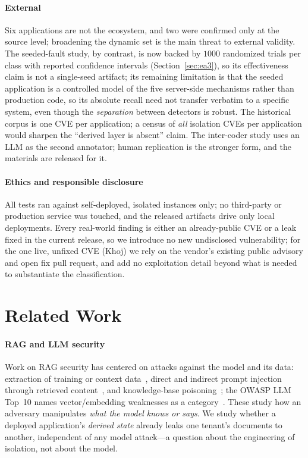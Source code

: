 \IfFileExists{IEEEtran.cls}{\documentclass[conference]{IEEEtran}}{\documentclass[10pt,twocolumn]{article}}
\begin{document}
\paragraph{External}
Six applications are not the ecosystem, and two were confirmed only at the source level; broadening
the dynamic set is the main threat to external validity. The seeded-fault study, by contrast, is now
backed by $1000$ randomized trials per class with reported confidence intervals
(Section~\ref{sec:ea3}), so its effectiveness claim is not a single-seed artifact; its remaining
limitation is that the seeded application is a controlled model of the five server-side mechanisms
rather than production code, so its absolute recall need not transfer verbatim to a specific system,
even though the \emph{separation} between detectors is robust. The historical corpus is one CVE per
application; a census of \emph{all} isolation CVEs per application would sharpen the ``derived layer
is absent'' claim. The inter-coder study uses an LLM as the second annotator; human replication is
the stronger form, and the materials are released for it.

\paragraph{Ethics and responsible disclosure}
All tests ran against self-deployed, isolated instances only; no third-party or production service
was touched, and the released artifacts drive only local deployments. Every real-world finding is
either an already-public CVE or a leak fixed in the current release, so we introduce no new
undisclosed vulnerability; for the one live, unfixed CVE (Khoj) we rely on the vendor's existing
public advisory and open fix pull request, and add no exploitation detail beyond what is needed to
substantiate the classification.

\section{Related Work}
\label{sec:related}
\paragraph{RAG and LLM security}
Work on RAG security has centered on attacks against the model and its data: extraction of training
or context data~\cite{carlini2021extracting,zeng2024ragprivacy}, direct and indirect prompt
injection through retrieved content~\cite{greshake2023indirect,liu2024promptinject}, and
knowledge-base poisoning~\cite{zou2025poisonedrag}; the OWASP LLM Top~10 names vector/embedding
weaknesses as a category~\cite{owasp2025llm}. These study how an adversary manipulates \emph{what the model knows or
says}. We study whether a deployed application's \emph{derived state} already leaks one tenant's
documents to another, independent of any model attack---a question about the engineering of
isolation, not about the model.
\end{document}
